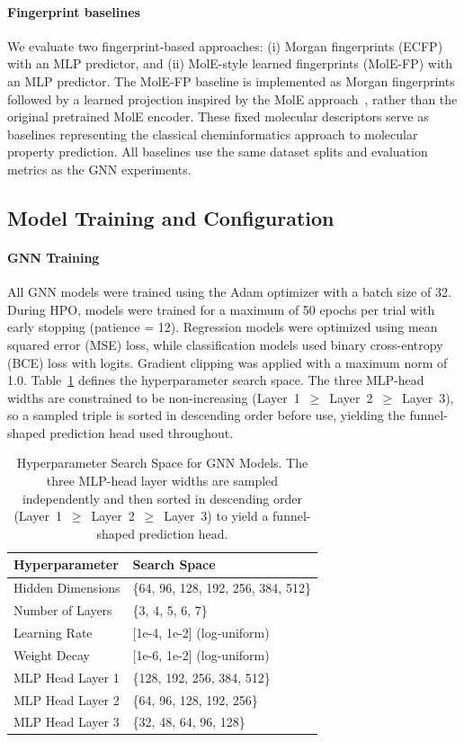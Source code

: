 \documentclass[journal]{IEEEtran}
\begin{document}
\paragraph{Fingerprint baselines}
We evaluate two fingerprint-based approaches: (i) Morgan fingerprints (ECFP)~\cite{rogers2010ecfp} with an MLP predictor, and (ii) MolE-style learned fingerprints (MolE-FP) with an MLP predictor. The MolE-FP baseline is implemented as Morgan fingerprints followed by a learned projection inspired by the MolE approach~\cite{molE}, rather than the original pretrained MolE encoder. These fixed molecular descriptors serve as baselines representing the classical cheminformatics approach to molecular property prediction. All baselines use the same dataset splits and evaluation metrics as the GNN experiments.




\subsection{Model Training and Configuration}
\label{sec:model_training}

\paragraph{GNN Training}
All GNN models were trained using the Adam optimizer with a batch size of 32. During HPO, models were trained for a maximum of 50 epochs per trial with early stopping (patience = 12). Regression models were optimized using mean squared error (MSE) loss, while classification models used binary cross-entropy (BCE) loss with logits. Gradient clipping was applied with a maximum norm of 1.0. Table~\ref{tab:search_space} defines the hyperparameter search space. The three MLP-head widths are constrained to be non-increasing (Layer~1~$\geq$~Layer~2~$\geq$~Layer~3), so a sampled triple is sorted in descending order before use, yielding the funnel-shaped prediction head used throughout.

\begin{table}[!t]
\centering
\caption{Hyperparameter Search Space for GNN Models. The three MLP-head layer widths are sampled independently and then sorted in descending order (Layer~1~$\geq$~Layer~2~$\geq$~Layer~3) to yield a funnel-shaped prediction head.}
\label{tab:search_space}
\small
\begin{tabular}{ll}
\toprule
\textbf{Hyperparameter} & \textbf{Search Space} \\
\midrule
Hidden Dimensions & \{64, 96, 128, 192, 256, 384, 512\} \\
Number of Layers & \{3, 4, 5, 6, 7\} \\
Learning Rate & [1e-4, 1e-2] (log-uniform) \\
Weight Decay & [1e-6, 1e-2] (log-uniform) \\
MLP Head Layer 1 & \{128, 192, 256, 384, 512\} \\
MLP Head Layer 2 & \{64, 96, 128, 192, 256\} \\
MLP Head Layer 3 & \{32, 48, 64, 96, 128\} \\
\bottomrule
\end{tabular}
\end{table}
\end{document}
